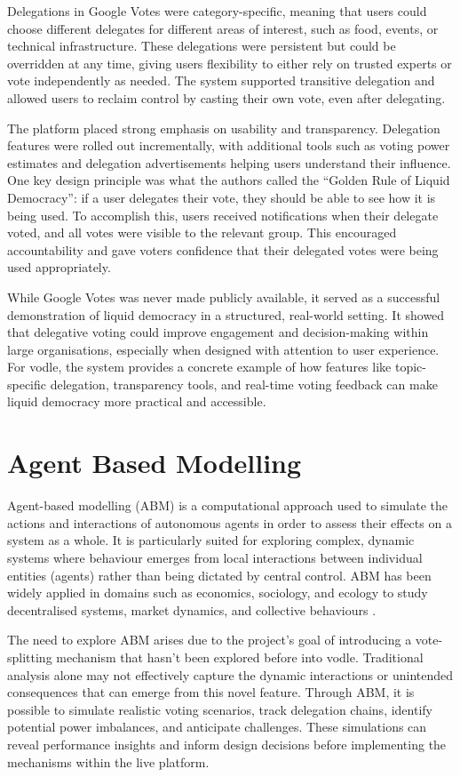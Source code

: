 Delegations in Google Votes were category-specific, meaning that users could choose different delegates for different areas of interest, such as food, events, or technical infrastructure. These delegations were persistent but could be overridden at any time, giving users flexibility to either rely on trusted experts or vote independently as needed. The system supported transitive delegation and allowed users to reclaim control by casting their own vote, even after delegating.

The platform placed strong emphasis on usability and transparency. Delegation features were rolled out incrementally, with additional tools such as voting power estimates and delegation advertisements helping users understand their influence. One key design principle was what the authors called the ``Golden Rule of Liquid Democracy'': if a user delegates their vote, they should be able to see how it is being used. To accomplish this, users received notifications when their delegate voted, and all votes were visible to the relevant group. This encouraged accountability and gave voters confidence that their delegated votes were being used appropriately.

While Google Votes was never made publicly available, it served as a successful demonstration of liquid democracy in a structured, real-world setting. It showed that delegative voting could improve engagement and decision-making within large organisations, especially when designed with attention to user experience. For vodle, the system provides a concrete example of how features like topic-specific delegation, transparency tools, and real-time voting feedback can make liquid democracy more practical and accessible.
\section{Agent Based Modelling}
Agent-based modelling (ABM) is a computational approach used to simulate the actions and interactions of autonomous agents in order to assess their effects on a system as a whole. It is particularly suited for exploring complex, dynamic systems where behaviour emerges from local interactions between individual entities (agents) rather than being dictated by central control. ABM has been widely applied in domains such as economics, sociology, and ecology to study decentralised systems, market dynamics, and collective behaviours \citep{bonabeau2002agent}.

The need to explore ABM arises due to the project's goal of introducing a vote-splitting mechanism that hasn't been explored before into vodle. Traditional analysis alone may not effectively capture the dynamic interactions or unintended consequences that can emerge from this novel feature. Through ABM, it is possible to simulate realistic voting scenarios, track delegation chains, identify potential power imbalances, and anticipate challenges. These simulations can reveal performance insights and inform design decisions before implementing the mechanisms within the live platform.


